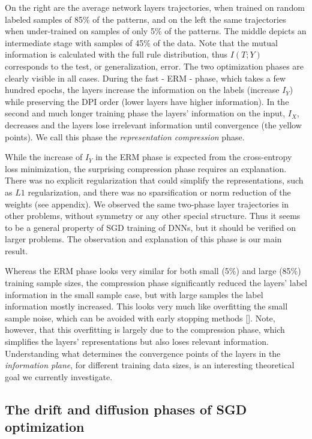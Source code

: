 \documentclass[11pt]{article}
\begin{document}
On the right are the average network layers trajectories, when trained on random labeled samples of 85\% of the patterns, and on the left the same trajectories when under-trained on samples of only 5\% of the patterns. The middle depicts an intermediate stage with samples of 45\% of the data. Note that the mutual information is calculated with the full rule distribution, thus $I(T;Y)$ corresponds to the test, or generalization, error.  
The two optimization phases are clearly visible in all cases. During the fast - ERM - phase, which takes a few hundred  epochs, the layers increase the information on the labels (increase $I_{Y}$) while preserving the DPI order (lower layers have higher information). In the second and much longer training phase the layers' information on the input, $I_X$, decreases and the layers lose irrelevant information until convergence (the yellow points). 
We call this phase the \emph{representation compression} phase. 

While the increase of $I_{Y}$ in the ERM phase is expected from the cross-entropy loss minimization, the surprising compression phase requires an explanation.  There was no explicit regularization that could simplify the representations, such as $L1$ regularization, and there was no sparsification or norm reduction of the weights (see appendix). 
We observed the same two-phase layer trajectories in other problems, without symmetry or any other special structure. 
Thus it seems to be a general property of SGD training of DNNs, but it should be verified on larger problems. The observation and explanation of this phase is our main result.

Whereas the ERM phase looks very similar for both small (5\%) and large (85\%) training sample sizes, the compression phase significantly reduced the layers' label information in the small sample case, but with large samples the label information mostly increased. This looks very much like overfitting the small sample noise, which can be avoided with early stopping methods [\citet{Larochelle:2009:EST:1577069.1577070}]. Note, however, that this overfitting is largely due to the compression phase, which simplifies the layers' representations but also loses relevant information.  Understanding what determines the convergence points of the layers in the \textit{information plane}, for different training data sizes, is an interesting theoretical goal we currently investigate.


\subsection{The drift and diffusion phases of SGD optimization}
\end{document}
